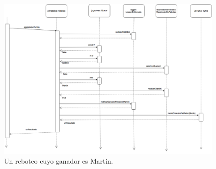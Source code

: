 \begin{landscape}

  \begin{figure}[h!]
   \includegraphics[scale=0.35]{imagenes/reboteo.png}
   \caption{Un reboteo cuyo ganador es Martin.}
  \end{figure}

\end{landscape}


